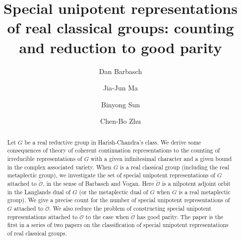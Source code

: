 \documentclass[12pt]{amsart}
\newcommand{\CO}{{\mathcal {O}}}
\numberwithin{equation}{section}
\theoremstyle{remark}
\begin{document}
\title[Special unipotent representations]{Special unipotent representations of real classical groups: counting and reduction to good parity}

\author [D. Barbasch] {Dan Barbasch}
\address{Department of Mathematics\\
  310 Malott Hall, Cornell University, Ithaca, New York 14853 }

\author [J.-J. Ma] {Jia-Jun Ma}
\address{School of Mathematical Sciences\\
  Xiamen University\\
  Xiamen, China} 

\author [B. Sun] {Binyong Sun}
\address{Institute for Advanced Study in Mathematics\\
 Zhejiang University\\
  Hangzhou, China} 


\author [C.-B. Zhu] {Chen-Bo Zhu}
\address{Department of Mathematics\\
  National University of Singapore\\
  10 Lower Kent Ridge Road, Singapore 119076} 




 


\begin{abstract} Let $G$ be a real reductive group in Harish-Chandra's class. We derive some consequences of theory of coherent continuation representations
 to the counting of irreducible representations of $G$ with a given infinitesimal character and a given bound in the complex associated variety. When $G$ is a real classical group (including the real metaplectic group), we investigate the set of special unipotent representations of $G$ attached to $\check \CO$, in the sense of Barbasch and Vogan. Here $\check \CO$ is a nilpotent adjoint orbit in the Langlands dual of $G$ (or the metaplectic dual of $G$ when $G$ is a real metaplectic group). We give a precise count for the number of special unipotent representations of $G$ attached to $\check \CO$. We also reduce the problem of constructing special unipotent representations attached to $\check \CO$ to the case when $\check \CO$ has good parity. The paper is the first in a series of two papers on the classification of special unipotent representations of real classical groups.
\end{abstract}
\end{document}
